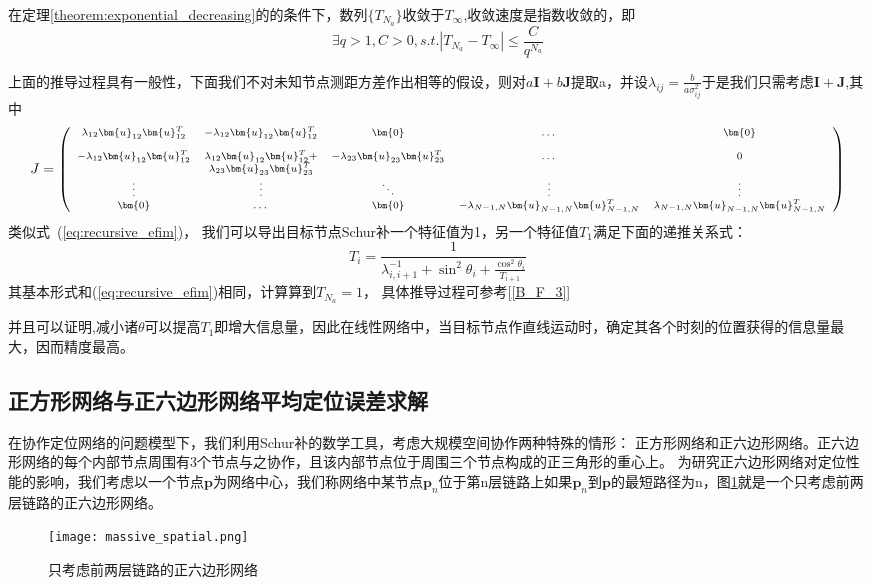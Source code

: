 \begin{corollary}\label{corollary:exponential_decreasing}
在定理\ref{theorem:exponential_decreasing}的的条件下，数列$\{T_{N_a}\}$收敛于$T_{\infty}$,收敛速度是指数收敛的，即\[
\exists q>1,C>0,s.t. |T_{N_a}-T_{\infty}|\leq\frac{C}{q^{N_a}}
\]
\end{corollary}
上面的推导过程具有一般性，下面我们不对未知节点测距方差作出相等的假设，则对$a\bm{I}+b\bm{J}$提取a，并设$\lambda_{ij}=\frac{b}{a\sigma_{ij}^2}$于是我们只需考虑$\bm{I}+\bm{J}$,其中
\[\scriptsize{
J=\left(
\begin{array}{ccccc}
\lambda_{12}\bm{u}_{12}\bm{u}_{12}^T&-\lambda_{12}\bm{u}_{12}\bm{u}_{12}^T&\bm{0}&\dots&\bm{0}\\
&&&&\\
-\lambda_{12}\bm{u}_{12}\bm{u}_{12}^T&\lambda_{12}\bm{u}_{12}\bm{u}_{12}^T+&-\lambda_{23}\bm{u}_{23}\bm{u}_{23}^T&\dots&0\\
&\lambda_{23}\bm{u}_{23}\bm{u}_{23}^T&&&\\
\vdots &\vdots&\ddots &\vdots&\vdots\\
\bm{0}&\dots&\bm{0}&-\lambda_{N-1,N}\bm{u}_{N-1,N}\bm{u}_{N-1,N}^T&\lambda_{N-1,N}\bm{u}_{N-1,N}\bm{u}_{N-1,N}^T\\
\end{array}
\right)}
\]
类似式~(\ref{eq:recursive_efim})，
我们可以导出目标节点Schur补一个特征值为1，另一个特征值$T_1$满足下面的递推关系式：
\begin{equation}\label{eq:recursive_efim_second}
  T_i=\frac{1}{\lambda_{i,i+1}^{-1}+\sin^2\theta_i+\frac{\cos^2\theta_i}{T_{i+1}}}
\end{equation}
其基本形式和(\ref{eq:recursive_efim})相同，计算算到$T_{N_a}=1$，
具体推导过程可参考[\ref{B_F_3}]

并且可以证明,减小诸$\theta$可以提高$T_1$即增大信息量，因此在线性网络中，当目标节点作直线运动时，确定其各个时刻的位置获得的信息量最大，因而精度最高。
\subsection{正方形网络与正六边形网络平均定位误差求解}\label{subsection:square_and_hexagon_network}
在协作定位网络的问题模型下，我们利用Schur补的数学工具，考虑大规模空间协作两种特殊的情形：
正方形网络和正六边形网络。正六边形网络的每个内部节点周围有3个节点与之协作，且该内部节点位于周围三个节点构成的正三角形的重心上。
为研究正六边形网络对定位性能的影响，我们考虑以一个节点$\bm{p}$为网络中心，我们称网络中某节点$\bm{p}_n$位于第n层链路上如果$\bm{p}_n$到$\bm{p}$的最短路径为n，图\ref{HexagonNetwork}就是一个只考虑前两层链路的正六边形网络。
\begin{figure}[h]
  \centering
  \texttt{[image: massive\_spatial.png]}
  \caption{只考虑前两层链路的正六边形网络}\label{HexagonNetwork}
\end{figure}

